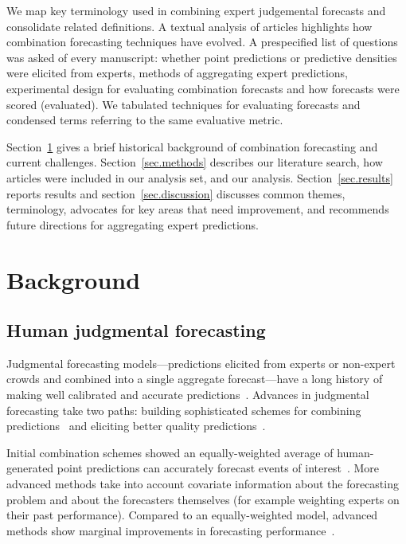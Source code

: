 \documentclass[preprint,authoryear]{elsarticle}
\begin{document}
We map key terminology used in combining expert judgemental forecasts and consolidate related definitions.
A textual analysis of articles highlights how combination forecasting techniques have evolved.
A prespecified list of questions was asked of every manuscript: whether point predictions or predictive densities were elicited from experts, methods of aggregating expert predictions, experimental design for evaluating combination forecasts and how forecasts were scored (evaluated).
We tabulated techniques for evaluating forecasts and condensed terms referring to the same evaluative metric.

Section~\ref{background} gives a brief historical background of combination forecasting and current challenges.
Section~\ref{sec.methods} describes our literature search, how articles were included in our analysis set, and our analysis.
Section~\ref{sec.results} reports results and section~\ref{sec.discussion} discusses common themes, terminology, advocates for key areas that need improvement, and recommends future directions for aggregating expert predictions.

\section{Background}
\label{background}

\subsection{Human judgmental forecasting}

Judgmental forecasting models---predictions elicited from experts or non-expert crowds and combined into a single aggregate forecast---have a long history of making well calibrated and accurate predictions~\citep{edmundson1990decomposition,bunn1991interaction,lawrence1992exploring,o1993judgemental}.
Advances in judgmental forecasting take two paths: building sophisticated schemes for combining predictions~\citep{clemen1989combining,clemen1999combining,clemen2008comment} and eliciting better quality predictions~\cite{ayyub2001elicitation,helmer1967analysis}. 

Initial combination schemes showed an equally-weighted average of human-generated point predictions can accurately forecast events of interest~\citep{galton1907vox}.
More advanced methods take into account covariate information about the forecasting problem and about the forecasters themselves (for example weighting experts on their past performance).
Compared to an equally-weighted model, advanced methods show marginal improvements in forecasting performance~\citep{fischer1999combining,mclaughlin1973forecasters,armstrong1985crystal,winkler1971probabilistic,clemen1989combining}.
\end{document}
